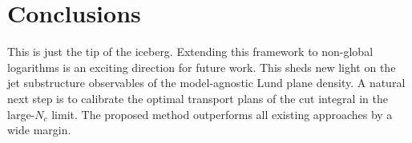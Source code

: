 \section{Conclusions}\label{sec:conclusions}

This is just the tip of the iceberg. Extending this framework to
non-global logarithms is an exciting direction for future work. This
sheds new light on the jet substructure observables of the
model-agnostic Lund plane density. A natural next step is to calibrate
the optimal transport plans of the cut integral in the large-$N_c$
limit. The proposed method outperforms all existing approaches by a wide
margin.

